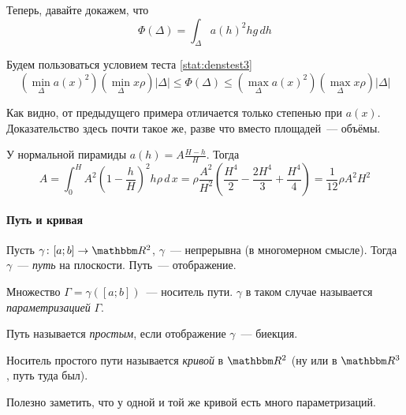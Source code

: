\documentclass[12pt]{../../notes}
\begin{document}
\begin{exmp}
  Теперь, давайте докажем, что
  \[ 
    \Phi \left( \Delta \right) = \int_{\Delta} a \left( h \right)^2 hg \, d h 
  \]
  
  
  Будем пользоваться условием теста
  \ref{stat:denstest3}
  \[ \left( \min_{\Delta} a \left( x \right)^2 \right)  \left( \min_{\Delta}
     x \rho \right)  \left| \Delta \right| \leqslant \Phi \left( \Delta
    \right) \leqslant \left( \max_{\Delta} a \left( x \right)^2 \right) 
    \left( \max_{\Delta} x \rho \right) \left| \Delta \right| 
  \]
  
  
  Как видно, от предыдущего примера
  отличается только степенью при $a \left( x
  \right)$. Доказательство здесь почти такое
  же, разве что вместо площадей~--- объёмы.
  
  У нормальной пирамиды $a \left( h \right) = A \frac{H - h}{H}$. Тогда
  \[ 
    A = \int_0^H A^2  \left( 1 - \frac{h}{H} \right)^2 h \rho \, d \, x =
    \rho \frac{A^2}{H^2}  \left( \frac{H^4}{2} - \frac{2 H^4}{3} +
    \frac{H^4}{4} \right) = \frac{1}{12} \rho A^2 H^2 
  \]
  
\end{exmp}

\paragraph{Путь и кривая}
\begin{defn}\label{defn:path}
  Пусть $\gamma \colon [a;b] \to \R^2$, $\gamma$~--- непрерывна (в многомерном смысле). 
  Тогда $\gamma$~--- \emph{путь} на плоскости. Путь~--- отображение.
\end{defn}
\begin{defn}\label{defn:pathcarr}
  Множество $\Gamma = \gamma([a;b])$~--- носитель пути. $\gamma$ в таком случае называется \emph{параметризацией}
  $\Gamma$. 
\end{defn}

\begin{defn}\label{defn:simppath}
  Путь называется \emph{простым}, если отображение $\gamma$~--- биекция.
\end{defn}

\begin{defn}\label{defn:curve}
  Носитель простого пути называется \emph{кривой} \cite{zorich} в $\R^2$ (ну или в $\R^3$, путь туда был).
\end{defn}

\begin{rem*}
  Полезно заметить, что у одной и той же кривой есть много параметризаций. 
\end{rem*}
\end{document}
